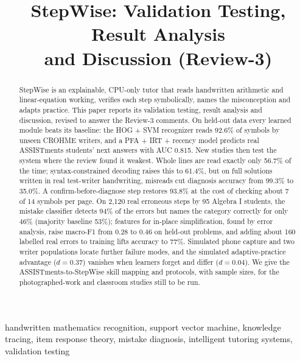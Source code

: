 \documentclass[conference]{IEEEtran}
\begin{document}
\title{StepWise: Validation Testing, Result Analysis\\and Discussion (Review-3)}

\author{
\and
{}
}

\maketitle

\begin{abstract}
StepWise is an explainable, CPU-only tutor that reads handwritten arithmetic and linear-equation working, verifies each step symbolically, names the misconception and adapts practice. This paper reports its validation testing, result analysis and discussion, revised to answer the Review-3 comments. On held-out data every learned module beats its baseline: the HOG + SVM recognizer reads 92.6\% of symbols by unseen CROHME writers, and a PFA + IRT + recency model predicts real ASSISTments students' next answers with AUC 0.815. New studies then test the system where the review found it weakest. Whole lines are read exactly only 56.7\% of the time; syntax-constrained decoding raises this to 61.4\%, but on full solutions written in real test-writer handwriting, misreads cut diagnosis accuracy from 99.3\% to 35.0\%. A confirm-before-diagnose step restores 93.8\% at the cost of checking about 7 of 14 symbols per page. On 2,120 real erroneous steps by 95 Algebra I students, the mistake classifier detects 94\% of the errors but names the category correctly for only 46\% (majority baseline 53\%); features for in-place simplification, found by error analysis, raise macro-F1 from 0.28 to 0.46 on held-out problems, and adding about 160 labelled real errors to training lifts accuracy to 77\%. Simulated phone capture and two writer populations locate further failure modes, and the simulated adaptive-practice advantage ($d=0.37$) vanishes when learners forget and differ ($d=0.04$). We give the ASSISTments-to-StepWise skill mapping and protocols, with sample sizes, for the photographed-work and classroom studies still to be run.
\end{abstract}

\begin{IEEEkeywords}
handwritten mathematics recognition, support vector machine, knowledge tracing, item response theory, mistake diagnosis, intelligent tutoring systems, validation testing
\end{IEEEkeywords}
\end{document}
